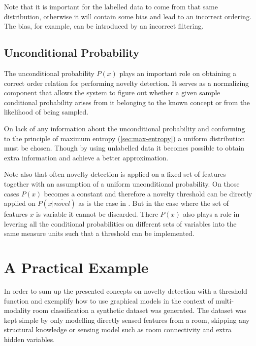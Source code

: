 Note that it is important for the labelled data to come from that same
distribution, otherwise it will contain some bias and lead to an incorrect
ordering. The bias, for example, can be introduced by an incorrect filtering.

\subsection{Unconditional Probability}
The unconditional probability $P(x)$ plays an important role on obtaining a
correct order relation for performing novelty detection.
It serves as a normalizing component that allows the system to figure out
whether a given sample conditional probability arises from it belonging to
the known concept or from the likelihood of being sampled.


On lack of any information about the unconditional probability and conforming to
the principle of maximum entropy (\autoref{sec:max-entropy}) a uniform
distribution must be chosen.
Though by using unlabelled data it becomes possible to obtain extra information
and achieve a better approximation.


Note also that often novelty detection is applied on a fixed set of features
together with an assumption of a uniform unconditional probability.
On those cases $P(x)$ becomes a constant and therefore a novelty threshold
can be directly applied on $P(x|\overline{novel})$ as is the case in \cite{bishop1994novelty}.
But in the case where the set of features $x$ is variable it cannot be
discarded. There $P(x)$ also plays a role in levering all the conditional
probabilities on different sets of variables into the same measure units
such that a threshold can be implemented.



\clearpage
\section{A Practical Example}
\label{sec:unlabelled-data}
In order to sum up the presented concepts on novelty detection with a threshold
function and exemplify how to use graphical models in the context of
multi-modality room classification a synthetic dataset was generated.
The dataset was kept simple by only modelling directly sensed features from a
room, skipping any structural knowledge or sensing model such as room
connectivity and extra hidden variables.

